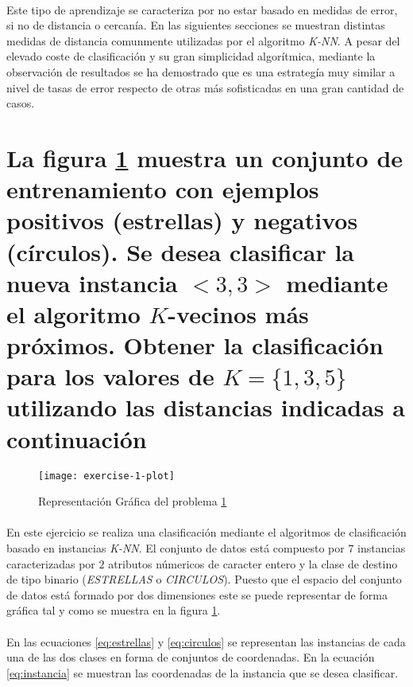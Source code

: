 \documentclass{article}
\begin{document}
		\paragraph{}
		Este tipo de aprendizaje se caracteriza por no estar basado en medidas de error, si no de distancia o cercanía. En las siguientes secciones se muestran distintas medidas de distancia comunmente utilizadas por el algoritmo \emph{K-NN}. A pesar del elevado coste de clasificación y su gran simplicidad algorítmica, mediante la observación de resultados se ha demostrado que es una estrategía muy similar a nivel de tasas de error respecto de otras más sofisticadas en una gran cantidad de casos.

	\section{La figura \ref{e1:plot} muestra un conjunto de entrenamiento con ejemplos positivos (estrellas) y negativos (círculos). Se desea clasificar la nueva instancia $<3,3>$ mediante el algoritmo $K$-vecinos más próximos. Obtener la clasificación para los valores de $K=\{ 1, 3, 5\}$ utilizando las distancias indicadas a continuación}
	\label{sec:e1}

		\begin{figure}
			\begin{center}
				\texttt{[image: exercise-1-plot]}
			\end{center}
			\caption{Representación Gráfica del problema \ref{sec:e1}}
			\label{e1:plot}
		\end{figure}

		\paragraph{}
		En este ejercicio se realiza una clasificación mediante el algoritmos de clasificación basado en instancias \emph{K-NN}. El conjunto de datos está compuesto por $7$ instancias caracterizadas por $2$ atributos númericos de caracter entero y la clase de destino de tipo binario (\emph{ESTRELLAS} o \emph{CIRCULOS}). Puesto que el espacio del conjunto de datos está formado por dos dimensiones este se puede representar de forma gráfica tal y como se muestra en la figura \ref{e1:plot}.

		\paragraph{}
		En las ecuaciones \eqref{eq:estrellas} y \eqref{eq:circulos} se representan las instancias de cada una de las dos clases en forma de conjuntos de coordenadas. En la ecuación \eqref{eq:instancia} se muestran las coordenadas de la instancia que se desea clasificar.
\end{document}
